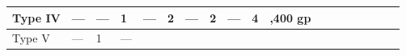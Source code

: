 \begin{longtable}{llllllllllllllllllllll}
{\begin{minipage}[t]{0.534in}
Type IV\end{minipage}} & \multicolumn{1}{p{0.341in}|}{\begin{minipage}[t]{0.341in}\centering
---\end{minipage}} & \multicolumn{1}{p{0.287in}|}{\begin{minipage}[t]{0.287in}\raggedright
---\end{minipage}} & \multicolumn{1}{p{0.287in}|}{\begin{minipage}[t]{0.287in}\raggedright
1\end{minipage}} & \multicolumn{1}{p{0.287in}|}{\begin{minipage}[t]{0.287in}\raggedright
---\end{minipage}} & \multicolumn{1}{p{0.287in}|}{\begin{minipage}[t]{0.287in}\raggedright
2\end{minipage}} & \multicolumn{1}{p{0.287in}|}{\begin{minipage}[t]{0.287in}\raggedright
---\end{minipage}} & \multicolumn{1}{p{0.287in}|}{\begin{minipage}[t]{0.287in}\raggedright
2\end{minipage}} & \multicolumn{1}{p{0.287in}|}{\begin{minipage}[t]{0.287in}\raggedright
---\end{minipage}} & \multicolumn{1}{p{0.287in}|}{\begin{minipage}[t]{0.287in}\raggedright
4\end{minipage}} & \multicolumn{12}{p{1.333in}|}{\begin{minipage}[t]{1.333in}\raggedleft
5,400 gp\end{minipage}}\\
\hline
\multicolumn{1}{p{0.054in}|}{\begin{minipage}[t]{0.054in}\raggedleft
Type V\end{minipage}} & \multicolumn{1}{p{0.054in}|}{\begin{minipage}[t]{0.054in}\centering
---\end{minipage}} & \multicolumn{1}{p{0.054in}|}{\begin{minipage}[t]{0.054in}\raggedright
1\end{minipage}} & \multicolumn{1}{p{0.054in}|}{\begin{minipage}[t]{0.054in}\raggedright
---\end{minipage}} & \multicolumn{1}{p{0.054in}|}{\begin{minipage}[t]{0.054in}\raggedright

\end{minipage}}
\end{longtable}
